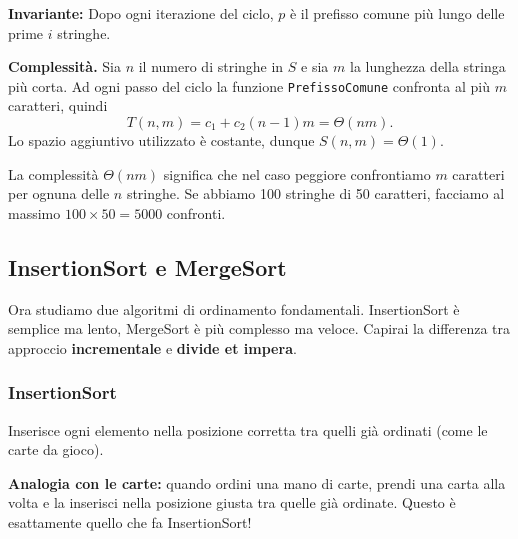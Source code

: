 \documentclass[a4paper, 11pt]{article}
\theoremstyle{definition}
\theoremstyle{remark}
\theoremstyle{remark}
\newenvironment{nota}{%
	\begin{tcolorbox}[
		colback=codebg,
		colframe=primary,
		fonttitle=\bfseries,
		title=Nota,
		left=6pt, right=6pt, top=4pt, bottom=4pt
		]
	}{%
	\end{tcolorbox}
}
\begin{document}
	\noindent\textbf{Invariante:} Dopo ogni iterazione del ciclo, $p$ è il prefisso comune più lungo delle prime $i$ stringhe.
	
	\textbf{Complessità.}
	Sia $n$ il numero di stringhe in $S$ e sia $m$ la lunghezza della
	stringa più corta. Ad ogni passo del ciclo la funzione
	\texttt{PrefissoComune} confronta al più $m$ caratteri, quindi
	\[
	T(n,m) = c_1 + c_2 (n-1)m = \Theta(nm).
	\]
	Lo spazio aggiuntivo utilizzato è costante, dunque $S(n,m) = \Theta(1)$.
	
	\begin{nota}
		La complessità $\Theta(nm)$ significa che nel caso peggiore confrontiamo $m$ caratteri per ognuna delle $n$ stringhe. Se abbiamo 100 stringhe di 50 caratteri, facciamo al massimo $100 \times 50 = 5000$ confronti.
	\end{nota}
	
	\pagebreak
	\subsection{InsertionSort e MergeSort}
	
	\begin{softnote}
		Ora studiamo due algoritmi di ordinamento fondamentali. InsertionSort è semplice ma lento, MergeSort è più complesso ma veloce. Capirai la differenza tra approccio \textbf{incrementale} e \textbf{divide et impera}.
	\end{softnote}
	
	\subsubsection{InsertionSort}
	
	Inserisce ogni elemento nella posizione corretta tra quelli già ordinati
	(come le carte da gioco).
	
	\begin{nota}
		\textbf{Analogia con le carte:} quando ordini una mano di carte, prendi una carta alla volta e la inserisci nella posizione giusta tra quelle già ordinate. Questo è esattamente quello che fa InsertionSort!
	\end{nota}
	
	\begin{algorithm}
		\caption{InsertionSort}
	\end{algorithm}
	
\end{document}
